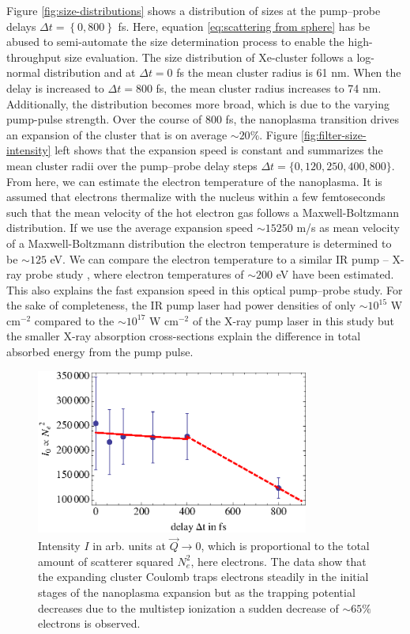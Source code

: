 Figure \ref{fig:size-distributions} shows a distribution of sizes at the pump--probe delays $\Delta t = \left\{0,800\right\}$ fs. Here, equation \eqref{eq:scattering from sphere} has be abused to semi-automate the size determination process to enable the high-throughput size evaluation. The size distribution of Xe-cluster follows a log-normal distribution \citep{Schutte-2002-IJMS} and at $\Delta t=0$ fs the mean cluster radius is 61 nm. When the delay is increased to $\Delta t=800$ fs, the mean cluster radius increases to 74 nm. Additionally, the distribution becomes more broad, which is due to the varying pump-pulse strength. Over the course of 800 fs, the nanoplasma transition drives an expansion of the cluster that is on average $\sim 20 \%$. Figure \ref{fig:filter-size-intensity} left shows that the expansion speed is constant and summarizes the mean cluster radii over the pump--probe delay steps $\Delta t=\{0,120,250,400,800\}$. From here, we can estimate the electron temperature of the nanoplasma. It is assumed that electrons thermalize with the nucleus within a few femtoseconds such that the mean velocity of the hot electron gas follows a Maxwell-Boltzmann distribution. If we use the average expansion speed $\sim 15250$ m/s as mean velocity of a Maxwell-Boltzmann distribution the electron temperature is determined to be $\sim 125$ eV. We can compare the electron temperature to a similar IR pump -- X-ray probe study \citep{Gorkhover-2016-NatPho}, where electron temperatures of $\sim 200$ eV have been estimated. This also explains the fast expansion speed in this optical pump--probe study. For the sake of completeness, the IR pump laser had power densities of only $\sim 10^{15}$ W cm$^{-2}$ compared to the $\sim 10^{17}$ W cm$^{-2}$ of the X-ray pump laser in this study but the smaller X-ray absorption cross-sections explain the difference in total absorbed energy from the pump pulse.\\
\begin{figure}
	\centering
		\includegraphics[width=0.80\textwidth]{images/results/number-of-scatterer.eps}
	\caption{Intensity $I$ in arb. units at $\vec{Q}\rightarrow 0$, which is proportional to the total amount of scatterer squared $N_{e}^{2}$, here electrons. The data show that the expanding cluster Coulomb traps electrons steadily in the initial stages of the nanoplasma expansion but as the trapping potential decreases due to the multistep ionization a sudden decrease of $\sim 65\%$ electrons is observed.}
	\label{fig:number-of-scatterer}
\end{figure}
